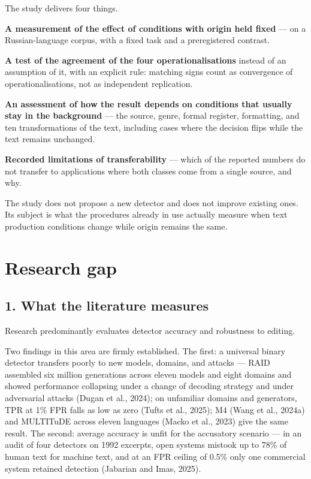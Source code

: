 \documentclass[11pt,a4paper]{article}
\renewcommand{\_}{\textunderscore\allowbreak}
\begin{document}
The study delivers four things.

\textbf{A measurement of the effect of conditions with origin held fixed} — on a
Russian-language corpus, with a fixed task and a preregistered contrast.

\textbf{A test of the agreement of the four operationalisations} instead of an
assumption of it, with an explicit rule: matching signs count as convergence of
operationalisations, not as independent replication.

\textbf{An assessment of how the result depends on conditions that usually stay in the
background} — the source, genre, formal register, formatting, and ten
transformations of the text, including cases where the decision flips while the
text remains unchanged.

\textbf{Recorded limitations of transferability} — which of the reported numbers do not
transfer to applications where both classes come from a single source, and why.

The study does not propose a new detector and does not improve existing ones. Its
subject is what the procedures already in use actually measure when text production
conditions change while origin remains the same.

\section{Research gap}

\subsection{1. What the literature measures}

Research predominantly evaluates detector accuracy and robustness to editing.

Two findings in this area are firmly established. The first: a universal binary
detector transfers poorly to new models, domains, and attacks — RAID assembled six
million generations across eleven models and eight domains and showed performance
collapsing under a change of decoding strategy and under adversarial attacks (Dugan et al., 2024); on
unfamiliar domains and generators, TPR at 1\% FPR falls as low as zero (Tufts et al., 2025); M4
(Wang et al., 2024a) and MULTITuDE across eleven languages (Macko et al., 2023) give the same result. The second:
average accuracy is unfit for the accusatory scenario — in an audit of four
detectors on 1992 excerpts, open systems mistook up to 78\% of human text for
machine text, and at an FPR ceiling of 0.5\% only one commercial system retained
detection (Jabarian and Imas, 2025).
\end{document}

